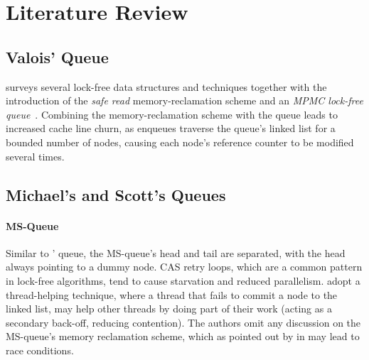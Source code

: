 \section{Literature Review\label{chap:lit_review}}

\subsection{Valois' Queue}

\citeauthor{valois1994queues} surveys several lock-free data structures and
techniques together with the introduction of the \emph{safe read}
memory-reclamation scheme and an \emph{MPMC lock-free
queue}~\citep{valois1994queues,valois1995datastructures}.
Combining the memory-reclamation scheme with the queue leads to increased cache line
churn, as enqueues traverse the queue's linked list for a bounded number of
nodes, causing each node's reference counter to be modified several times. 


\subsection{Michael's and Scott's Queues}

\paragraph{MS-Queue}
Similar to \citeauthor{valois1994queues}' queue, the MS-queue's head and tail
are separated, with the head always pointing to a dummy node. CAS
retry loops, which are a common pattern in lock-free algorithms, tend to
cause starvation and reduced parallelism.
\citeauthor{michael1996simple} adopt a thread-helping technique, where a thread
that fails to commit a node to the linked list, may help other threads by doing
part of their work (acting as a secondary back-off, reducing contention). 
The authors omit any discussion on the MS-queue's memory reclamation scheme,
which as pointed out by \citeauthor{michael2004hazard}
in \citep{michael2004hazard} may lead to race conditions. 

